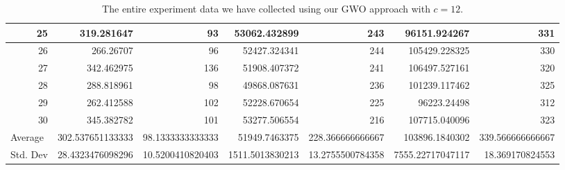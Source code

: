 \begin{table}
\begin{adjustwidth}{}{}
{{\begin{tabular}{|r|r|r|r|r|r|r|}
\hline
25                                         & 319.281647                   & 93                                    & 53062.432899                   & 243                                   & 96151.924267                 & 331                                    \\ 
\hline
26                                         & 266.26707                    & 96                                    & 52427.324341                   & 244                                   & 105429.228325                & 330                                    \\ 
\hline
27                                         & 342.462975                   & 136                                   & 51908.407372                   & 241                                   & 106497.527161                & 320                                    \\ 
\hline
28                                         & 288.818961                   & 98                                    & 49868.087631                   & 236                                   & 101239.117462                & 325                                    \\ 
\hline
29                                         & 262.412588                   & 102                                   & 52228.670654                   & 225                                   & 96223.24498                  & 312                                    \\ 
\hline
30                                         & 345.382782                   & 101                                   & 53277.506554                   & 216                                   & 107715.040096                & 323                                    \\ 
\hline
\multicolumn{1}{|l|}{Average}              & 302.537651133333             & 98.1333333333333                      & 51949.7463375                  & 228.366666666667                      & 103896.1840302               & 339.566666666667                       \\ 
\hline
\multicolumn{1}{|l|}{Std. Dev}             & 28.4323476098296             & 10.5200410820403                      & 1511.5013830213                & 13.2755500784358                      & 7555.22717047117             & 18.369170824553                        \\
\hline
\end{tabular}}}
\end{adjustwidth}
\caption{The entire experiment data we have collected using our GWO approach with $c = 12$.}
\label{full-data-gwo-c12}
\end{table}

